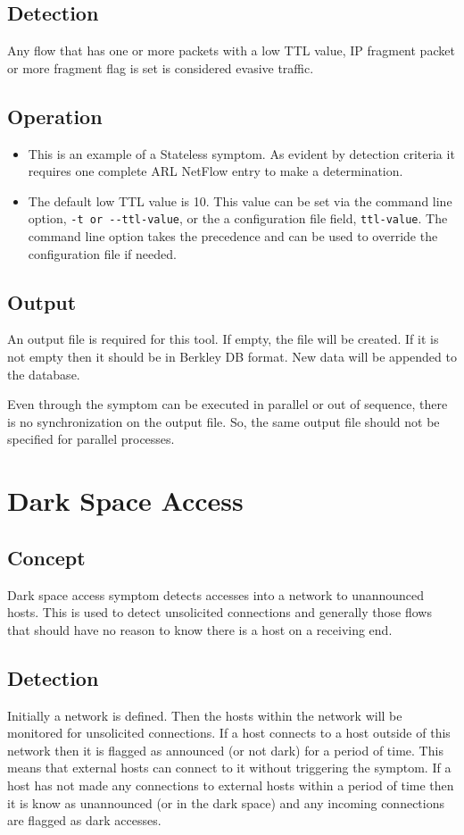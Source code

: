 \documentclass[titlepage,12pt]{report}
\begin{document}
\subsection{Detection}
Any flow that has one or more packets with a low TTL value, IP fragment packet or more fragment flag is set is considered evasive traffic. 

\subsection{Operation}
\begin{itemize}
\item This is an example of a Stateless symptom. As evident by detection criteria it requires one complete ARL NetFlow entry to make a determination.
\item The default low TTL value is 10. This value can be set via the command line option, \verb|-t or --ttl-value|, or the a configuration file field, \verb|ttl-value|. The command line option takes the precedence and can be used to override the configuration file if needed.
\end{itemize}

\subsection{Output}
An output file is required for this tool. If empty, the file will be created. If it is not empty then it should be in Berkley DB format. New data will be appended to the database.

Even through the symptom can be executed in parallel or out of sequence, there is no synchronization on the output file. So, the same output file should not be specified for parallel processes.

\section{Dark Space Access}
\subsection{Concept}
Dark space access symptom detects accesses into a network to unannounced hosts. This is used to detect unsolicited connections and generally those flows that should have no reason to know there is a host on a receiving end.

\subsection{Detection}
Initially a network is defined. Then the hosts within the network will be monitored for unsolicited connections. If a host connects to a host outside of this network then it is flagged as announced (or not dark) for a period of time. This means that external hosts can connect to it without triggering the symptom. If a host has not made any connections to external hosts within a period of time then it is know as unannounced (or in the dark space) and any incoming connections are flagged as dark accesses.
\end{document}
